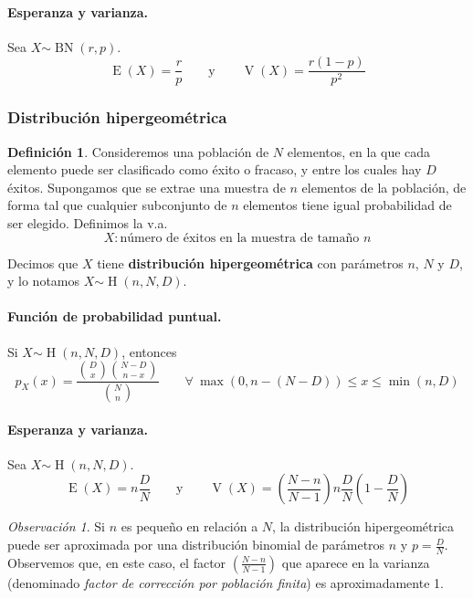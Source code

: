 \documentclass[11pt]{article}
\theoremstyle{plain}
\theoremstyle{definition}
\newtheorem*{defi}{Definición}
\theoremstyle{remark}
\newtheorem*{obs}{Observación}
\newcommand{\deft}[1]{\textbf{#1}}  %
\newcommand{\esp}[0]{\ensuremath{\operatorname{E}}}  %
\newcommand{\var}[0]{\ensuremath{\operatorname{V}}}  %
\newcommand{\foralle}{\ensuremath{\forall \ }}  %
\newcommand{\dist}[1]{\ensuremath{\sim \operatorname{#1}}}  %
\begin{document}
      \paragraph{Esperanza y varianza.}
      Sea $X \dist{BN}(r,p)$.
      \[ \esp(X) = \frac{r}{p} \qquad \text{y} \qquad \var(X) = \frac{r(1 - p)}{p^2} \]

    \subsubsection{Distribución hipergeométrica}

      \begin{defi}
        Consideremos una población de $N$ elementos, en la que cada elemento puede ser clasificado como éxito o fracaso, y entre los cuales hay $D$ éxitos. Supongamos que se extrae una muestra de $n$ elementos de la población, de forma tal que cualquier subconjunto de $n$ elementos tiene igual probabilidad de ser elegido. Definimos la v.a.
        \[ X : \text{número de éxitos en la muestra de tamaño $n$} \]

        Decimos que $X$ tiene \deft{distribución hipergeométrica} con parámetros $n$, $N$ y $D$, y lo notamos $X \dist{H}(n,N,D)$.
      \end{defi}

      \paragraph{Función de probabilidad puntual.}
      Si $X \dist{H}(n,N,D)$, entonces
      \[ p_X(x) = \frac{\binom{D}{x} \binom{N - D}{n - x}}{\binom{N}{n}} \qquad \foralle \max(0, n - (N - D)) \leq x \leq \min(n, D) \]

      \paragraph{Esperanza y varianza.}
      Sea $X \dist{H}(n,N,D)$.
      \[ \esp(X) = n \frac{D}{N} \qquad \text{y} \qquad \var(X) = \left( \frac{N - n}{N - 1} \right) n \frac{D}{N} \left( 1 - \frac{D}{N} \right) \]

      \begin{obs}
        Si $n$ es pequeño en relación a $N$, la distribución hipergeométrica puede ser aproximada por una distribución binomial de parámetros $n$ y $p = \frac{D}{N}$. Observemos que, en este caso, el factor $\left( \frac{N - n}{N - 1}\right)$ que aparece en la varianza (denominado \emph{factor de corrección por población finita}) es aproximadamente 1.
      \end{obs}
\end{document}
